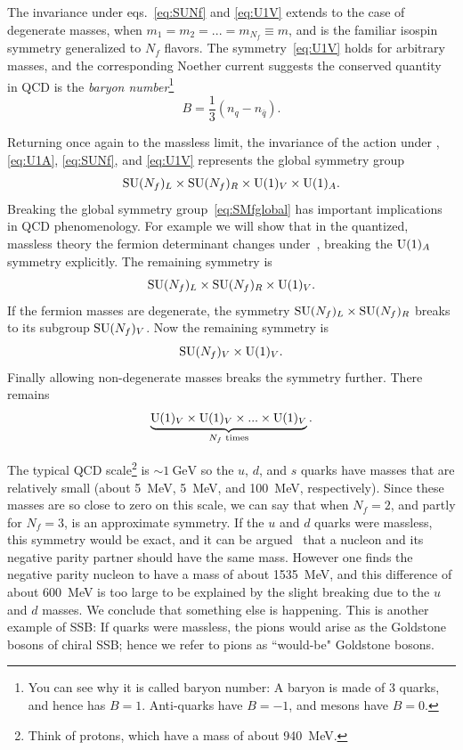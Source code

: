 The invariance under eqs.~\eqref{eq:SUNf} and \eqref{eq:U1V} extends to the case of degenerate
masses, when $m_1=m_2=...=m_{N_f}\equiv m$, and is the familiar isospin
symmetry generalized to $N_f$ flavors. The symmetry~\eqref{eq:U1V} holds for
arbitrary masses, and the corresponding Noether current suggests
the conserved quantity in QCD is the 
{\it baryon number}\footnote{You can see why it is called baryon number: 
A baryon is made of 3
quarks, and hence has $B=1$. Anti-quarks have $B=-1$, and
mesons have $B=0$.}
\begin{equation}
    B=\frac{1}{3}(n_q-n_{\bar{q}}).
\end{equation}


Returning once again to the massless limit, the invariance of the action under
, \eqref{eq:U1A}, \eqref{eq:SUNf}, and \eqref{eq:U1V}
represents the global symmetry group
\begin{equation}\label{eq:SMfglobal}
  \operatorname{SU}(N_f)_L\times\operatorname{SU}(N_f)_R\times\operatorname{U}(1)_V\times\operatorname{U}(1)_A.
\end{equation}
Breaking the global symmetry group~\eqref{eq:SMfglobal} has important
implications in QCD phenomenology. For example we will show that in the
quantized, massless theory the fermion determinant changes
under~, breaking the $\operatorname{U}(1)_A$ symmetry explicitly. The remaining
symmetry is
\begin{equation}\label{eq:SMglobalbUA}
  \operatorname{SU}(N_f)_L\times\operatorname{SU}(N_f)_R\times\operatorname{U}(1)_V.
\end{equation}
If the fermion masses are degenerate, the symmetry $\operatorname{SU}(N_f)_L\times\operatorname{SU}(N_f)_R$
breaks to its subgroup $\operatorname{SU}(N_f)_V$. Now the remaining symmetry is
\begin{equation}
  \operatorname{SU}(N_f)_V\times\operatorname{U}(1)_V.
\end{equation}
Finally allowing non-degenerate masses breaks the symmetry further.
There remains
\begin{equation}
  \underbrace{\operatorname{U}(1)_V\times\operatorname{U}(1)_V\times...\times\operatorname{U}(1)_V}_\text{$N_f$ times}.
\end{equation}

The typical QCD scale\footnote{Think of protons, which have a mass of about
940~MeV.} is $\sim1~\text{GeV}$ 
so the $u$, $d$, and $s$ quarks have masses that
are relatively small (about 5~MeV, 5~MeV, and 100~MeV, respectively).
Since these masses are so close to zero on this scale, we can say that
when $N_f=2$, and partly for $N_f=3$,  is
an approximate symmetry. If the $u$ and $d$ quarks were massless, this symmetry
would be exact, and it can be argued~\cite{gattringer_quantum_2010} that
a nucleon and its negative parity partner should have the same mass.
However one finds the negative parity nucleon to have
a mass of about 1535~MeV, and this difference of about 600~MeV is too large to
be explained by the slight breaking due to the $u$ and $d$ masses. We
conclude that something else is happening. This is another example
of SSB: If quarks were massless, the pions would arise as
the Goldstone bosons of chiral SSB; hence we refer to pions as
``would-be" Goldstone bosons.


